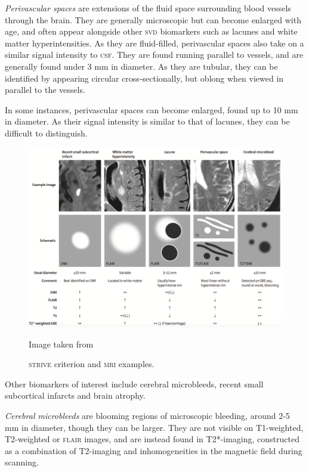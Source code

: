 \textit{Perivascular spaces} are extensions of the fluid space surrounding blood vessels through the brain. They are generally microscopic but can become enlarged with age, and often appear alongside other \textsc{svd} biomarkers such as lacunes and white matter hyperintensities. As they are fluid-filled, perivascular spaces also take on a similar signal intensity to \textsc{csf}. They are found running parallel to vessels, and are generally found under 3 mm in diameter. As they are tubular, they can be identified by appearing circular cross-sectionally, but oblong when viewed in parallel to the vessels.

In some instances, perivascular spaces can become enlarged, found up to 10 mm in diameter. As their signal intensity is similar to that of lacunes, they can be difficult to distinguish. 

\begin{figure}[ht]
	\centering
	\includegraphics[width = \textwidth]{Images/2_STRIVE.png}
	\caption{\textsc{strive} criterion and \textsc{mri} examples.}
	\small Image taken from \cite{WardlawJ.M.2013Nsfr}
\end{figure}

Other biomarkers of interest include cerebral microbleeds, recent small subcortical infarcts and brain atrophy. 

\textit{Cerebral microbleeds} are blooming regions of microscopic bleeding, around 2-5 mm in diameter, though they can be larger. They are not visible on T1-weighted, T2-weighted or \textsc{flair} images, and are instead found in T2*-imaging, constructed as a combination of T2-imaging and inhomogeneities in the magnetic field during scanning. 

